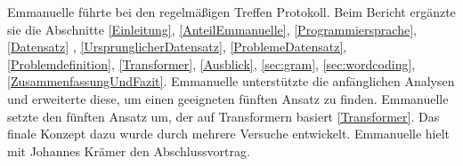 \label{AnteilEmmanuelle}
Emmanuelle führte bei den regelmäßigen Treffen Protokoll.
Beim Bericht ergänzte sie die Abschnitte \ref{Einleitung}, \ref{AnteilEmmanuelle}, \ref{Programmiersprache}, \ref{Datensatz} , \ref{UrsprunglicherDatensatz}, \ref{ProblemeDatensatz}, \ref{Problemdefinition}, \ref{Transformer}, \ref{Ausblick}, \ref{sec:gram}, \ref{sec:wordcoding}, \ref{ZusammenfassungUndFazit}.
Emmanuelle unterstützte die anfänglichen Analysen und erweiterte diese, um einen geeigneten fünften Ansatz zu finden.
Emmanuelle setzte den fünften Ansatz um, der auf Transformern basiert \ref{Transformer}. Das finale Konzept dazu wurde durch mehrere Versuche entwickelt.
Emmanuelle hielt mit Johannes Krämer den Abschlussvortrag. %

